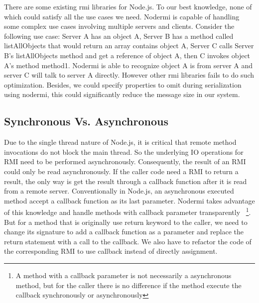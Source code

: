 There are some existing rmi libraries for Node.js.
To our best knowledge, none of which could satisfy all the use cases we need.
Nodermi is capable of handling some complex use cases involving multiple servers and clients.
Consider the following use case:
Server A has an object A,
Server B has a method called listAllObjects that would return an array contains object A,
Server C calls Server B's listAllObjects method and get a reference of object A,
then C invokes object A's method method1.
Nodermi is able to recognize object A is from server A and server C will talk to server A directly.
However other rmi libraries fails to do such optimization.
Besides, we could specify properties to omit during serialization using nodermi,
this could significantly reduce the message size in our system.

\subsection{Synchronous Vs. Asynchronous}
Due to the single thread nature of Node.js,
it is critical that remote method invocations do not block the main thread.
So the underlying IO operations for RMI need to be performed asynchronously.
Consequently, the result of an RMI could only be read asynchronously.
If the caller code need a RMI to return a result,
the only way is get the result through a callback function
after it is read from a remote server.
Conventionally in Node.js, an asynchronous executed method
accept a callback function as its last parameter.
Nodermi takes advantage of this knowledge and handle methods with callback parameter transparently
~\footnote{A method with a callback parameter is not necessarily a asynchronous method,
but for the caller there is no difference if the method execute the callback synchronously or asynchronously}.
But for a method that is originally use return keyword to the caller,
we need to change its signature to add a callback function as a parameter and
replace the return statement with a call to the callback. %
We also have to refactor the code of the corresponding RMI to use callback instead of
directly assignment.





